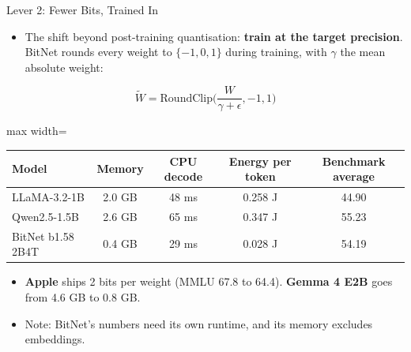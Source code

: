 \begin{frame}{Lever 2: Fewer Bits, Trained In}
    \begin{itemize}\itemsep0.3em
        \item The shift beyond post-training quantisation: \textbf{train at the target precision}. BitNet rounds every weight to $\{-1,0,1\}$ during training, with $\gamma$ the mean absolute weight:
    \end{itemize}
    \[
        \tilde W=\mathrm{RoundClip}\!\Big(\frac{W}{\gamma+\epsilon},-1,1\Big)
    \]
    \begin{center}
    \small
    \begin{adjustbox}{max width=\linewidth}\begin{tabular}{lcccc}
        \toprule
        \textbf{Model} & \textbf{Memory} & \textbf{CPU decode} & \textbf{Energy per token} & \textbf{Benchmark average} \\
        \midrule
        LLaMA-3.2-1B & 2.0 GB & 48 ms & 0.258 J & 44.90 \\
        Qwen2.5-1.5B & 2.6 GB & 65 ms & 0.347 J & 55.23 \\
        \rowcolor{KAUSTcyan!12} BitNet b1.58 2B4T & 0.4 GB & 29 ms & 0.028 J & 54.19 \\
        \bottomrule
    \end{tabular}\end{adjustbox}
    \end{center}
    \begin{itemize}\itemsep0.3em
        \item \textbf{Apple} ships 2 bits per weight (MMLU 67.8 to 64.4). \textbf{Gemma 4 E2B} goes from 4.6 GB to 0.8 GB.
        \item Note: BitNet's numbers need its own runtime, and its memory excludes embeddings.
    \end{itemize}
\end{frame}

